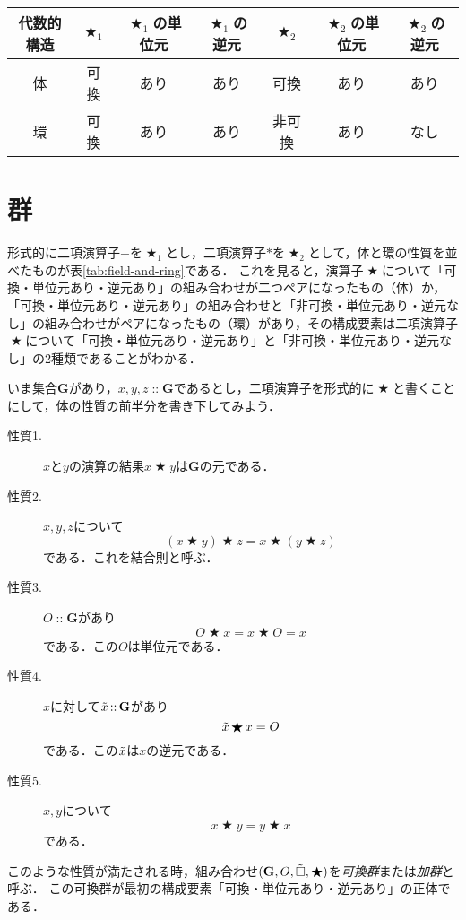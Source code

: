 \documentclass[twocolumn]{jsbook}
\newcommand{\mathAnyBinaryOperator}{\mathop{\bigstar}}
\newcommand{\mathSomething}{\square}
\newcommand{\mathIn}[1]{\mathop{::}#1}
\newcommand{\mathInverse}[1]{\Tilde{#1}}
\newcommand{\mathSet}[1]{\mathbf{#1}}
\newcommand{\mathGroup}[4]{(#1,#2,#3,#4)}
\newcommand{\keyword}[1]{\emph{#1}}
\newcommand{\mathsetname}[1]{\boldsymbol{#1}}
\begin{document}
\begin{table*}
\caption{代表的な代数的構造の性質(1)}
\label{tab:field-and-ring}
\begin{center}
\begin{tabular}{||c||c|c|c|c|c|c||}
\hline
代数的構造&$\mathAnyBinaryOperator_1$&$\mathAnyBinaryOperator_1$の単位元&$\mathAnyBinaryOperator_1$の逆元&$\mathAnyBinaryOperator_2$&$\mathAnyBinaryOperator_2$の単位元&$\mathAnyBinaryOperator_2$の逆元\\
\hline\hline
体&可換&あり&あり&可換&あり&あり\\
環&可換&あり&あり&非可換&あり&なし\\
\hline
\end{tabular}
\end{center}
\end{table*}

\section{群}

形式的に二項演算子$+$を$\mathAnyBinaryOperator_1$とし，二項演算子$*$を$\mathAnyBinaryOperator_2$として，体と環の性質を並べたものが表\ref{tab:field-and-ring}である．
これを見ると，演算子$\mathAnyBinaryOperator$について「可換・単位元あり・逆元あり」の組み合わせが二つペアになったもの（体）か，「可換・単位元あり・逆元あり」の組み合わせと「非可換・単位元あり・逆元なし」の組み合わせがペアになったもの（環）があり，その構成要素は二項演算子$\mathAnyBinaryOperator$について「可換・単位元あり・逆元あり」と「非可換・単位元あり・逆元なし」の2種類であることがわかる．

いま集合$\mathSet{G}$があり，$x,y,z\mathIn\mathsetname{G}$であるとし，二項演算子を形式的に$\mathAnyBinaryOperator$と書くことにして，体の性質の前半分を書き下してみよう．
\begin{description}
\item[性質1.] $x$と$y$の演算の結果$x\mathAnyBinaryOperator y$は$\mathSet{G}$の元である．
\item[性質2.] $x,y,z$について$$(x\mathAnyBinaryOperator y)\mathAnyBinaryOperator z=x\mathAnyBinaryOperator(y\mathAnyBinaryOperator z)$$である．これを結合則と呼ぶ．
\item[性質3.] $O\mathIn\mathSet{G}$があり$$O\mathAnyBinaryOperator x=x\mathAnyBinaryOperator O=x$$である．この$O$は単位元である．
\item[性質4.] $x$に対して$\mathInverse{x}\mathIn\mathSet{G}$があり$$\mathInverse{x}\mathAnyBinaryOperator x=O$$である．この$\mathInverse{x}$は$x$の逆元である．
\item[性質5.] $x,y$について$$x\mathAnyBinaryOperator y=y\mathAnyBinaryOperator x$$である．
\end{description}
このような性質が満たされる時，組み合わせ$\mathGroup{\mathSet{G}}{O}{\mathInverse{\mathSomething}}{\mathAnyBinaryOperator}$を\keyword{可換群}または\keyword{加群}と呼ぶ．
この可換群が最初の構成要素「可換・単位元あり・逆元あり」の正体である．
\end{document}
